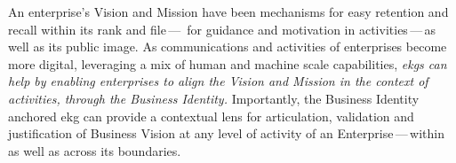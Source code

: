 %
%
An enterprise’s Vision and Mission have been mechanisms for easy
retention and recall within its rank and file\,---\,%
for guidance and motivation in activities\,---\,as well as its public image.
As communications and activities of enterprises become more digital, leveraging a mix of human and machine scale
capabilities, \textit{\glspl{ekg} can help by enabling enterprises to align the Vision and Mission
in the context of activities, through the Business Identity.}
Importantly, the Business Identity anchored \gls{ekg} can provide a contextual lens for articulation,
validation and justification of Business Vision at any level of activity of an Enterprise\,---\,within as well as
across its boundaries.
